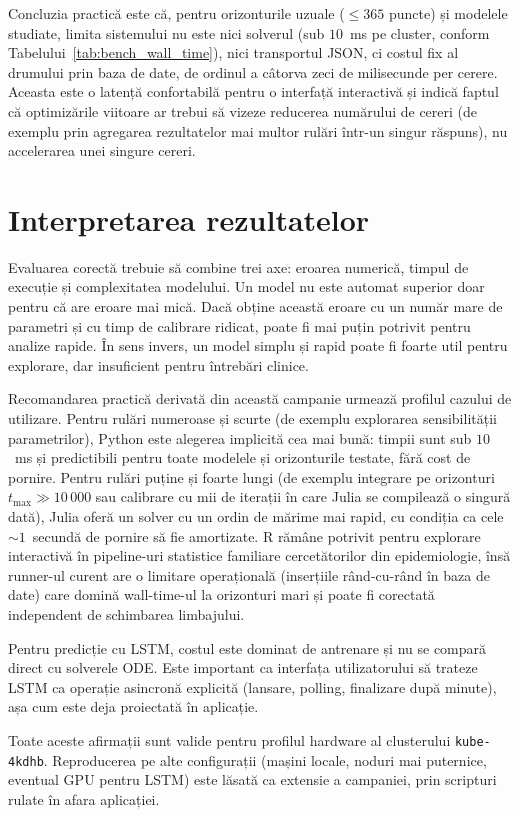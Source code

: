 Concluzia practică este că, pentru orizonturile uzuale ($\le 365$ puncte) și
modelele studiate, limita sistemului nu este nici solverul (sub $10$~ms pe
cluster, conform Tabelului~\ref{tab:bench_wall_time}), nici transportul JSON, ci
costul fix al drumului prin baza de date, de ordinul a câtorva zeci de
milisecunde per cerere. Aceasta este o latență confortabilă pentru o interfață
interactivă și indică faptul că optimizările viitoare ar trebui să vizeze
reducerea numărului de cereri (de exemplu prin agregarea rezultatelor mai multor
rulări într-un singur răspuns), nu accelerarea unei singure cereri.

\section{Interpretarea rezultatelor}
\label{sec:analiza_sintetica}

Evaluarea corectă trebuie să combine trei axe: eroarea numerică, timpul de
execuție și complexitatea modelului. Un model nu este automat superior doar
pentru că are eroare mai mică. Dacă obține această eroare cu un număr mare de
parametri și cu timp de calibrare ridicat, poate fi mai puțin potrivit pentru
analize rapide. În sens invers, un model simplu și rapid poate fi foarte util
pentru explorare, dar insuficient pentru întrebări clinice.

Recomandarea practică derivată din această campanie urmează profilul cazului
de utilizare. Pentru rulări numeroase și scurte (de exemplu explorarea
sensibilității parametrilor), Python este alegerea implicită cea mai bună:
timpii sunt sub $10$~ms și predictibili pentru toate modelele și orizonturile
testate, fără cost de pornire. Pentru rulări puține și foarte lungi (de
exemplu integrare pe orizonturi $t_{\max} \gg 10\,000$ sau calibrare cu mii
de iterații în care Julia se compilează o singură dată), Julia oferă un
solver cu un ordin de mărime mai rapid, cu condiția ca cele $\sim$$1$~secundă
de pornire să fie amortizate. R rămâne potrivit pentru explorare interactivă
în pipeline-uri statistice familiare cercetătorilor din epidemiologie, însă
runner-ul curent are o limitare operațională (inserțiile rând-cu-rând în
baza de date) care domină wall-time-ul la orizonturi mari și poate fi
corectată independent de schimbarea limbajului.

Pentru predicție cu LSTM, costul este dominat de antrenare și nu se compară
direct cu solverele ODE. Este important ca interfața utilizatorului să trateze
LSTM ca operație asincronă explicită (lansare, polling, finalizare după
minute), așa cum este deja proiectată în aplicație.

Toate aceste afirmații sunt valide pentru profilul hardware al clusterului
\texttt{kube-4kdhb}. Reproducerea pe alte configurații (mașini locale, noduri
mai puternice, eventual GPU pentru LSTM) este lăsată ca extensie a campaniei,
prin scripturi rulate în afara aplicației.
